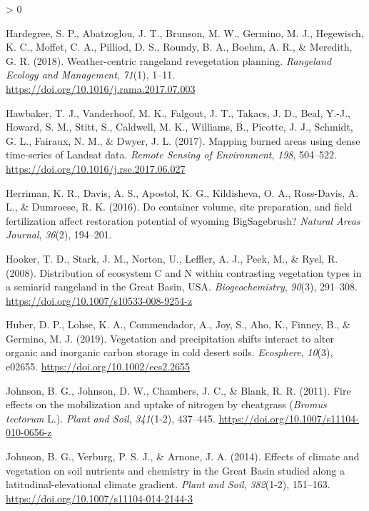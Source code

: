 \documentclass[
  11pt,
  a4paper,
]{article}
\newlength{\cslhangindent}
\newenvironment{CSLReferences}[2] %
 {%
  \setlength{\parindent}{0pt}
  \ifodd #1 \everypar{\setlength{\hangindent}{\cslhangindent}}\ignorespaces\fi
  \ifnum #2 > 0
  \setlength{\parskip}{#2\baselineskip}
  \fi
 }%
 {}
\begin{document}
\begin{CSLReferences}{1}{0}
\leavevmode\hypertarget{ref-Hardegree2018}{}%
Hardegree, S. P., Abatzoglou, J. T., Brunson, M. W., Germino, M. J., Hegewisch, K. C., Moffet, C. A., Pilliod, D. S., Roundy, B. A., Boehm, A. R., \& Meredith, G. R. (2018). {Weather-centric rangeland revegetation planning}. \emph{Rangeland Ecology and Management}, \emph{71}(1), 1--11. \url{https://doi.org/10.1016/j.rama.2017.07.003}

\leavevmode\hypertarget{ref-Hawbaker2017}{}%
Hawbaker, T. J., Vanderhoof, M. K., Falgout, J. T., Takacs, J. D., Beal, Y.-J., Howard, S. M., Stitt, S., Caldwell, M. K., Williams, B., Picotte, J. J., Schmidt, G. L., Fairaux, N. M., \& Dwyer, J. L. (2017). {Mapping burned areas using dense time-series of Landsat data}. \emph{Remote Sensing of Environment}, \emph{198}, 504--522. \url{https://doi.org/10.1016/j.rse.2017.06.027}

\leavevmode\hypertarget{ref-Herriman2016}{}%
Herriman, K. R., Davis, A. S., Apostol, K. G., Kildisheva, O. A., Ross-Davis, A. L., \& Dumroese, R. K. (2016). Do container volume, site preparation, and field fertilization affect restoration potential of wyoming BigSagebrush? \emph{Natural Areas Journal}, \emph{36}(2), 194--201.

\leavevmode\hypertarget{ref-Hooker2008biogeochem}{}%
Hooker, T. D., Stark, J. M., Norton, U., Leffler, A. J., Peek, M., \& Ryel, R. (2008). {Distribution of ecosystem C and N within contrasting vegetation types in a semiarid rangeland in the Great Basin, USA}. \emph{Biogeochemistry}, \emph{90}(3), 291--308. \url{https://doi.org/10.1007/s10533-008-9254-z}

\leavevmode\hypertarget{ref-Huber2019}{}%
Huber, D. P., Lohse, K. A., Commendador, A., Joy, S., Aho, K., Finney, B., \& Germino, M. J. (2019). {Vegetation and precipitation shifts interact to alter organic and inorganic carbon storage in cold desert soils}. \emph{Ecosphere}, \emph{10}(3), e02655. \url{https://doi.org/10.1002/ecs2.2655}

\leavevmode\hypertarget{ref-Johnson2011}{}%
Johnson, B. G., Johnson, D. W., Chambers, J. C., \& Blank, R. R. (2011). {Fire effects on the mobilization and uptake of nitrogen by cheatgrass (\emph{Bromus tectorum} L.)}. \emph{Plant and Soil}, \emph{341}(1-2), 437--445. \url{https://doi.org/10.1007/s11104-010-0656-z}

\leavevmode\hypertarget{ref-Johnson2014}{}%
Johnson, B. G., Verburg, P. S. J., \& Arnone, J. A. (2014). Effects of climate and vegetation on soil nutrients and chemistry in the {Great} {Basin} studied along a latitudinal-elevational climate gradient. \emph{Plant and Soil}, \emph{382}(1-2), 151--163. \url{https://doi.org/10.1007/s11104-014-2144-3}


\end{CSLReferences}
\end{document}

